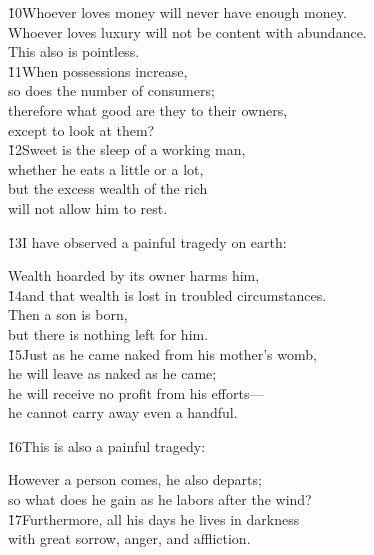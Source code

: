 \begin{poetry}
\poeml \v{10}Whoever loves money will never have enough money. \\
\poemll    Whoever loves luxury will not be content with abundance. \\
\poemlll       This also is pointless. \\
\poeml \v{11}When possessions increase, \\
\poemll    so does the number of consumers; \\
\poeml therefore what good are they to their owners, \\
\poemll    except to look at them? \\
\poeml \v{12}Sweet is the sleep of a working man, \\
\poemll    whether he eats a little or a lot, \\
\poeml but the excess wealth of the rich \\
\poemll    will not allow him to rest.
\end{poetry}

\v{13}I have observed a painful tragedy on earth:

\begin{poetry}
\poeml Wealth hoarded by its owner harms him, \\
\poeml \v{14}and that wealth is lost in troubled circumstances. \\
\poeml Then a son is born, \\
\poemll    but there is nothing left for him. \\
\poeml \v{15}Just as he came naked from his mother's womb, \\
\poemll    he will leave as naked as he came; \\
\poeml he will receive no profit from his efforts--- \\
\poemll    he cannot carry away even a handful.
\end{poetry}

\v{16}This is also a painful tragedy:

\begin{poetry}
\poeml However a person comes, he also departs; \\
\poemll    so what does he gain as he labors after the wind? \\
\poeml \v{17}Furthermore, all his days he lives in darkness \\
\poemll    with great sorrow, anger, and affliction.
\end{poetry}


